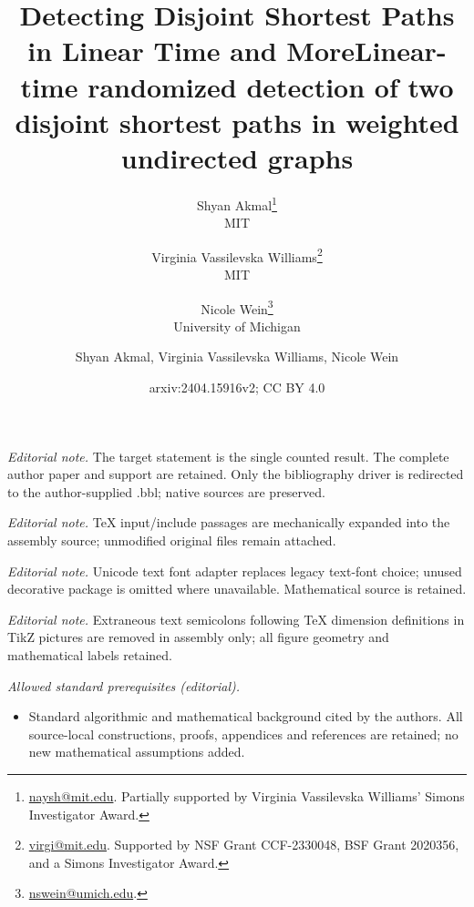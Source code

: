 \documentclass[11pt]{article}
\title{Detecting Disjoint Shortest Paths in Linear Time and More}
\author{
Shyan Akmal\thanks{\url{naysh@mit.edu}. Partially supported by Virginia Vassilevska Williams' Simons Investigator Award.}
\\MIT 
\and 
Virginia Vassilevska Williams\thanks{\url{virgi@mit.edu}. Supported by NSF Grant CCF-2330048, BSF Grant 2020356, and a Simons Investigator Award.}
\\MIT
\and
Nicole Wein\thanks{\url{nswein@umich.edu}.}\\University of Michigan}
\date{\vspace{-3ex}}
\title{Linear-time randomized detection of two disjoint shortest paths in weighted undirected graphs}
\author{Shyan Akmal, Virginia Vassilevska Williams, Nicole Wein}
\date{arxiv:2404.15916v2; CC BY 4.0}
\theoremstyle{definition}
\begin{document}
\maketitle
\noindent\textit{Editorial note.} The target statement is the single counted result. The complete author paper and support are retained. Only the bibliography driver is redirected to the author-supplied .bbl; native sources are preserved.\par\medskip
\noindent\textit{Editorial note.} TeX input/include passages are mechanically expanded into the assembly source; unmodified original files remain attached.\par\medskip
\noindent\textit{Editorial note.} Unicode text font adapter replaces legacy text-font choice; unused decorative package is omitted where unavailable. Mathematical source is retained.\par\medskip
\noindent\textit{Editorial note.} Extraneous text semicolons following TeX dimension definitions in TikZ pictures are removed in assembly only; all figure geometry and mathematical labels retained.\par\medskip
\noindent\textit{Allowed standard prerequisites (editorial).}\begin{itemize}
\item Standard algorithmic and mathematical background cited by the authors. All source-local constructions, proofs, appendices and references are retained; no new mathematical assumptions added.
\end{itemize}\medskip
\end{document}
